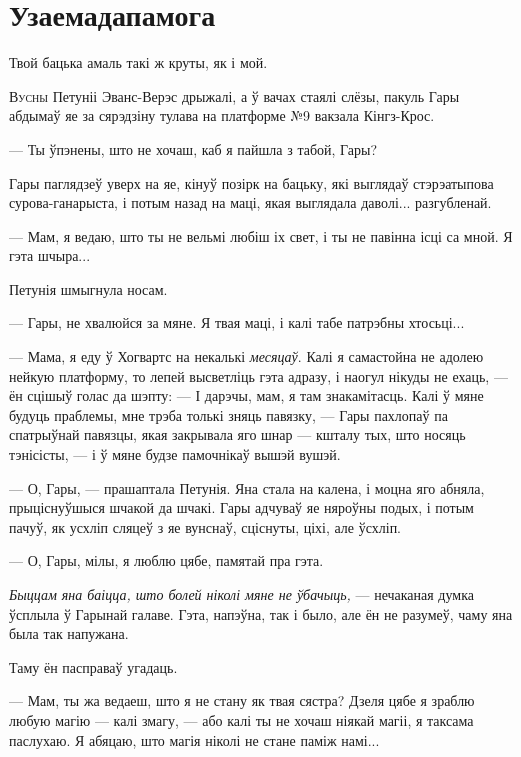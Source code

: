\chapter{Узаемадапамога}

\begin{chapterOpeningQuote}
    Твой бацька амаль такі ж круты, як і мой.
\end{chapterOpeningQuote}


\lettrine{В}{усны} Петуніі Эванс-Верэс дрыжалі, а ў вачах стаялі слёзы, пакуль
Гары абдымаў яе за сярэдзіну тулава на платформе №9 вакзала Кінгз-Крос.

--- Ты ўпэнены, што не хочаш, каб я пайшла з табой, Гары?

Гары паглядзеў уверх на яе, кінуў позірк на бацьку, які выглядаў стэрэатыпова
сурова-ганарыста, і потым назад на маці, якая выглядала даволі... разгубленай.

--- Мам, я ведаю, што ты не вельмі любіш іх свет, і ты не павінна ісці са мной.
Я гэта шчыра...

Петунія шмыгнула носам.

--- Гары, не хвалюйся за мяне. Я твая маці, і калі табе патрэбны хтосьці...

--- Мама, я еду ў Хогвартс на некалькі \emph{месяцаў}. Калі я самастойна не 
адолею нейкую платформу, то лепей высветліць гэта адразу, і наогул нікуды не ехаць, ---
ён сцішыў голас да шэпту: --- І дарэчы, мам, я там знакамітасць. Калі ў мяне 
будуць праблемы, мне трэба толькі зняць павязку, --- Гары пахлопаў па спатрыўнай
павязцы, якая закрывала яго шнар --- кшталу тых, што носяць тэнісісты, --- і 
ў мяне будзе памочнікаў вышэй вушэй. 

--- О, Гары, --- прашаптала Петунія. Яна стала на калена, і моцна яго абняла, 
прыціснуўшыся шчакой да шчакі. Гары адчуваў яе няроўны подых, і потым
пачуў, як усхліп сляцеў з яе вунснаў, сціснуты, ціхі, але ўсхліп. 

--- О, Гары, мілы, я люблю цябе, памятай пра гэта.

\emph{Быццам яна баіцца, што болей ніколі мяне не ўбачыць,} --- нечаканая
думка ўсплыла ў Гарынай галаве. Гэта, напэўна, так і было, але ён не разумеў,
чаму яна была так напужана.

Таму ён пасправаў угадаць.

--- Мам, ты жа ведаеш, што я не стану як твая сястра? Дзеля цябе я зраблю любую 
магію --- калі змагу, --- або калі ты не 
хочаш ніякай магіі, я таксама паслухаю. Я абяцаю, што магія ніколі не 
стане паміж намі...

